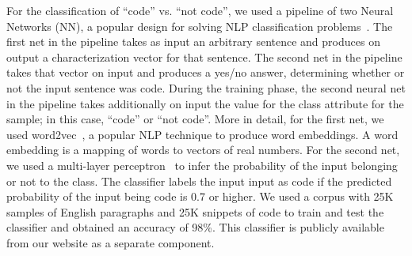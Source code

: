 \documentclass[sigconf,review, anonymous]{acmart}
\begin{document}
For the classification of ``code'' vs. ``not code'', we used a
pipeline of two Neural Networks (NN), a popular design for solving NLP
classification problems~\cite{kusner2015word}. The first net in the
pipeline takes as input an arbitrary sentence and produces on output a
characterization vector for that sentence. The second net in the
pipeline takes that vector on input and produces a yes/no answer,
determining whether or not the input sentence was code.  During the
training phase, the second neural net in the pipeline takes
additionally on input the value for the class attribute for the sample;
in this case, ``code'' or ``not code''. More in detail, for the first
net, we used word2vec~\cite{mikolov2013distributed}, a popular NLP
technique to produce word embeddings. A word embedding is a mapping of
words to vectors of real numbers. For the second net, we used a
multi-layer perceptron~\cite{Rumelhart:1986:LIR:104279.104293} to
infer the probability of the input belonging or not to the class. The
classifier labels the input input as code if the predicted probability
of the input being code is 0.7 or higher. We used a corpus with 25K
samples of English paragraphs and 25K snippets of \js{} code to train
and test the classifier and obtained an accuracy of 98\%. This
classifier is publicly available from our website as a separate
component.


\end{document}
